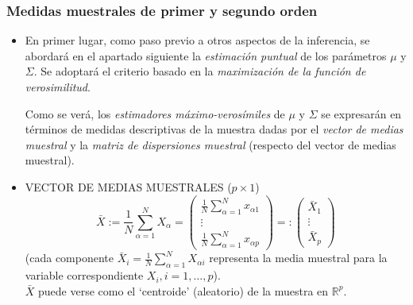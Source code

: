 \documentclass[11pt,a4paper]{article}
\begin{document}
\subsubsection{Medidas muestrales de primer y segundo orden}
\begin{itemize}
\item En primer lugar, como paso previo a otros aspectos de la inferencia, se abordará en el apartado siguiente la \emph{estimación puntual} de los parámetros $\mu$ y $\Sigma$. Se adoptará el criterio basado en la \emph{maximización de la función de verosimilitud}.

Como se verá, los \emph{estimadores máximo-verosímiles} de $\mu$ y $\Sigma$ se expresarán en términos de medidas descriptivas de la muestra dadas por el \emph{vector de medias muestral} y la \emph{matriz de dispersiones muestral} (respecto del vector de medias muestral).

\item VECTOR DE MEDIAS MUESTRALES ($p \times 1$)
$$\bar{X} := \frac{1}{N} \sum_{\alpha=1}^{N} X_{\alpha} = \begin{pmatrix}
\frac{1}{N} \sum_{\alpha=1}^{N} x_{\alpha 1} \\
\vdots \\
\frac{1}{N} \sum_{\alpha=1}^{N} x_{\alpha p}
\end{pmatrix} =: \begin{pmatrix} \bar{X}_{1} \\ \vdots \\ \bar{X}_{p} \end{pmatrix}$$
(cada componente $\bar{X}_{i} = \frac{1}{N} \sum_{\alpha=1}^{N} X_{\alpha i}$ representa la media muestral para la variable correspondiente $X_{i}, i = 1, \dots, p$). \\
$\bar{X}$ puede verse como el `centroide' (aleatorio) de la muestra en $\mathbb{R}^{p}$.


\end{itemize}
\end{document}
